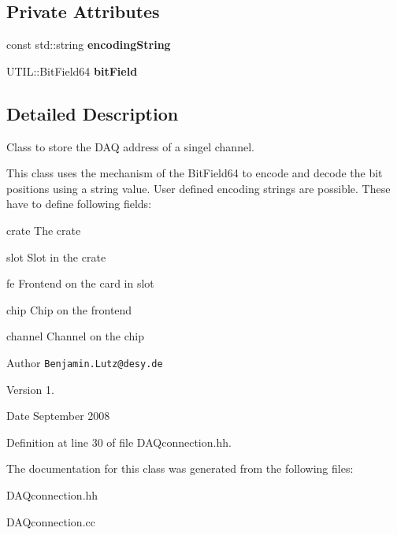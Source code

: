 \subsection*{Private Attributes}
\begin{DoxyCompactItemize}
\item 
const std\-::string {\bfseries encoding\-String}\label{classCALICE_1_1DAQconnection_ae7c2fbe117b63706706a28ac96610975}

\item 
U\-T\-I\-L\-::\-Bit\-Field64 {\bfseries bit\-Field}\label{classCALICE_1_1DAQconnection_a6d3903a6b24a78eb1c73ec087aeb8df1}

\end{DoxyCompactItemize}


\subsection{Detailed Description}
Class to store the D\-A\-Q address of a singel channel. 

This class uses the mechanism of the Bit\-Field64 to encode and decode the bit positions using a string value. User defined encoding strings are possible. These have to define following fields\-: \begin{DoxyItemize}
\item crate The crate \item slot Slot in the crate \item fe Frontend on the card in slot \item chip Chip on the frontend \item channel Channel on the chip\end{DoxyItemize}
\begin{DoxyAuthor}{Author}
{\tt Benjamin.\-Lutz@desy.\-de} 
\end{DoxyAuthor}
\begin{DoxyVersion}{Version}
1. 
\end{DoxyVersion}
\begin{DoxyDate}{Date}
September 2008 
\end{DoxyDate}


Definition at line 30 of file D\-A\-Qconnection.\-hh.



The documentation for this class was generated from the following files\-:\begin{DoxyCompactItemize}
\item 
D\-A\-Qconnection.\-hh\item 
D\-A\-Qconnection.\-cc\end{DoxyCompactItemize}
